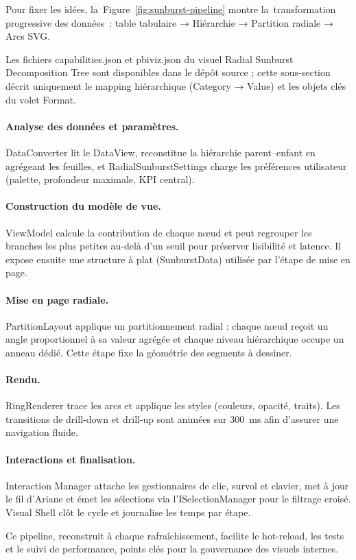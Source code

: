 Pour fixer les idées, la~Figure~\ref{fig:sunburst-pipeline} montre la~transformation progressive des données~: table tabulaire → Hiérarchie → Partition radiale → Arcs SVG\@.

Les fichiers capabilities.json et pbiviz.json du visuel Radial Sunburst Decomposition Tree sont disponibles dans le dépôt source ; cette sous-section décrit uniquement le mapping hiérarchique (Category → Value) et les objets clés du volet Format.

\paragraph{Analyse des données et paramètres.} DataConverter lit le DataView, reconstitue la hiérarchie parent–enfant en agrégeant les feuilles, et RadialSunburstSettings charge les préférences utilisateur (palette, profondeur maximale, KPI central).

\paragraph{Construction du modèle de vue.} ViewModel calcule la contribution de chaque nœud et peut regrouper les branches les plus petites au-delà d’un seuil pour préserver lisibilité et latence. Il expose ensuite une structure à plat (SunburstData) utilisée par l’étape de mise en page.

\paragraph{Mise en page radiale.} PartitionLayout applique un partitionnement radial : chaque nœud reçoit un angle proportionnel à sa valeur agrégée et chaque niveau hiérarchique occupe un anneau dédié. Cette étape fixe la géométrie des segments à dessiner.

\paragraph{Rendu.} RingRenderer trace les arcs et applique les styles (couleurs, opacité, traits). Les transitions de drill-down et drill-up sont animées sur \SI{300}{\milli\second} afin d’assurer une navigation fluide.

\paragraph{Interactions et finalisation.} Interaction Manager attache les gestionnaires de clic, survol et clavier, met à jour le fil d’Ariane et émet les sélections via l’ISelectionManager pour le filtrage croisé. Visual Shell clôt le cycle et journalise les temps par étape.

Ce pipeline, reconstruit à chaque rafraîchissement, facilite le hot-reload, les tests et le suivi de performance, points clés pour la gouvernance des visuels internes.
